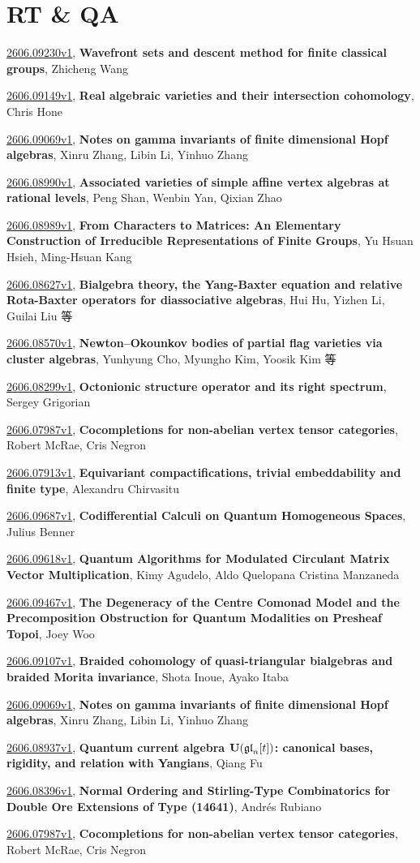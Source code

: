 \documentclass[9pt, a4paper]{article}
\theoremstyle{plain}
\theoremstyle{definition}
\theoremstyle{remark}
\newcommand{\arxiv}[3]{\href{https://arxiv.org/abs/#1}{#1}, \textbf{\textcolor{arxivblue}{#2}}, #3}
\begin{document}

\section{RT \& QA}
\arxiv{2606.09230v1}{Wavefront sets and descent method for finite classical groups}{Zhicheng Wang}

\arxiv{2606.09149v1}{Real algebraic varieties and their intersection cohomology}{Chris Hone}

\arxiv{2606.09069v1}{Notes on gamma invariants of finite dimensional Hopf algebras}{Xinru Zhang, Libin Li, Yinhuo Zhang}

\arxiv{2606.08990v1}{Associated varieties of simple affine vertex algebras at rational levels}{Peng Shan, Wenbin Yan, Qixian Zhao}

\arxiv{2606.08989v1}{From Characters to Matrices: An Elementary Construction of Irreducible Representations of Finite Groups}{Yu Hsuan Hsieh, Ming-Hsuan Kang}

\arxiv{2606.08627v1}{Bialgebra theory, the Yang-Baxter equation and relative Rota-Baxter operators for diassociative algebras}{Hui Hu, Yizhen Li, Guilai Liu 等}

\arxiv{2606.08570v1}{Newton--Okounkov bodies of partial flag varieties via cluster algebras}{Yunhyung Cho, Myungho Kim, Yoosik Kim 等}

\arxiv{2606.08299v1}{Octonionic structure operator and its right spectrum}{Sergey Grigorian}

\arxiv{2606.07987v1}{Cocompletions for non-abelian vertex tensor categories}{Robert McRae, Cris Negron}

\arxiv{2606.07913v1}{Equivariant compactifications, trivial embeddability and finite type}{Alexandru Chirvasitu}

\arxiv{2606.09687v1}{Codifferential Calculi on Quantum Homogeneous Spaces}{Julius Benner}

\arxiv{2606.09618v1}{Quantum Algorithms for Modulated Circulant Matrix Vector Multiplication}{Kimy Agudelo, Aldo Quelopana Cristina Manzaneda}

\arxiv{2606.09467v1}{The Degeneracy of the Centre Comonad Model and the Precomposition Obstruction for Quantum Modalities on Presheaf Topoi}{Joey Woo}

\arxiv{2606.09107v1}{Braided cohomology of quasi-triangular bialgebras and braided Morita invariance}{Shota Inoue, Ayako Itaba}

\arxiv{2606.09069v1}{Notes on gamma invariants of finite dimensional Hopf algebras}{Xinru Zhang, Libin Li, Yinhuo Zhang}

\arxiv{2606.08937v1}{Quantum current algebra ${\bf U}(\frak{gl}_n[t])$: canonical bases, rigidity, and relation with Yangians}{Qiang Fu}

\arxiv{2606.08396v1}{Normal Ordering and Stirling-Type Combinatorics for Double Ore Extensions of Type (14641)}{Andrés Rubiano}

\arxiv{2606.07987v1}{Cocompletions for non-abelian vertex tensor categories}{Robert McRae, Cris Negron}

\end{document}
